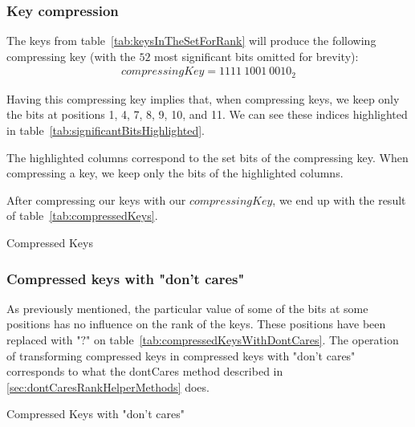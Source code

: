 \subsubsection{Key compression} \label{sec:keyCompression}

The keys from table~\ref{tab:keysInTheSetForRank} will produce the following compressing key (with the $52$ most significant bits omitted for brevity):
\begin{align*}
    compressingKey = 1111\ 1001\ 0010_2
\end{align*}

Having this compressing key implies that, when compressing keys, we keep only the bits at positions 1, 4, 7, 8, 9, 10, and 11. We can see these indices highlighted in table~\ref{tab:significantBitsHighlighted}.

\begin{table}[H]
\centering

\caption[Example of bits that are kept when compressing keys]{The highlighted columns correspond to the set bits of the compressing key. When compressing a key, we keep only the bits of the highlighted columns.}
\label{tab:significantBitsHighlighted}
\end{table}

After compressing our keys with our $compressingKey$, we end up with the result of table~\ref{tab:compressedKeys}.

\begin{table}[H]
\centering

\caption[Example of compressed keys]{Compressed Keys}
\label{tab:compressedKeys}
\end{table}

\subsubsection{Compressed keys with "don't cares"} \label{sec:keyCompressionWithDontCares}

As previously mentioned, the particular value of some of the bits at some positions has no influence on the rank of the keys. These positions have been replaced with "$?$" on table~\ref{tab:compressedKeysWithDontCares}. The operation of transforming compressed keys in compressed keys with "don't cares" corresponds to what the {\ttfamily dontCares} method described in \ref{sec:dontCaresRankHelperMethods} does.

\begin{table}[H]
\centering

\caption[Example of compressed keys with "don't cares"]{Compressed Keys with "don't cares"}
\label{tab:compressedKeysWithDontCares}
\end{table}


